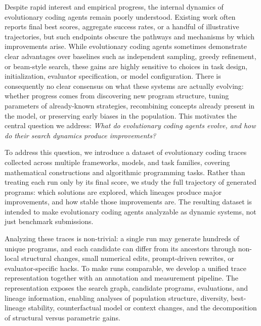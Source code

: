 Despite rapid interest and empirical progress, the internal dynamics of evolutionary coding agents remain poorly understood. Existing work often reports final best scores, aggregate success rates, or a handful of illustrative trajectories, but such endpoints obscure the pathways and mechanisms by which improvements arise. While evolutionary coding agents sometimes demonstrate clear advantages over baselines such as independent sampling, greedy refinement, or beam-style search, these gains are highly sensitive to choices in task design, initialization, evaluator specification, or model configuration.
There is consequently no clear consensus on what these systems are actually evolving: whether progress comes from discovering new program structure, tuning parameters of already-known strategies, recombining concepts already present in the model, or preserving early biases in the population.
This motivates the central question we address: \textit{What do evolutionary coding agents evolve, and how do their search dynamics produce improvements?}

To address this question, we introduce a dataset of evolutionary coding traces collected across multiple frameworks, models, and task families, covering mathematical constructions and algorithmic programming tasks. Rather than treating each run only by its final score, we study the full trajectory of generated programs: which solutions are explored, which lineages produce major improvements, and how stable those improvements are. The resulting dataset is intended to make evolutionary coding agents analyzable as dynamic systems, not just benchmark submissions.

Analyzing these traces is non-trivial: a single run may generate hundreds of unique programs, and each candidate can differ from its ancestors through non-local structural changes, small numerical edits, prompt-driven rewrites, or evaluator-specific hacks. To make runs comparable, we develop a unified trace representation together with an annotation and measurement pipeline. The representation exposes the search graph, candidate programs, evaluations, and lineage information, enabling analyses of population structure, diversity, best-lineage stability, counterfactual model or context changes, and the decomposition of structural versus parametric gains.



